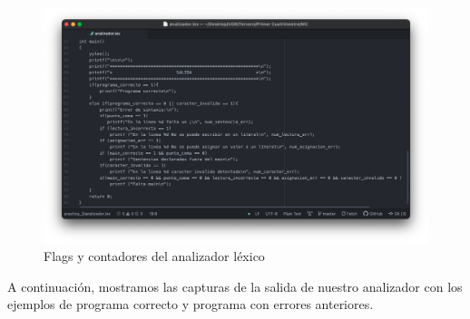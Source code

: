 \begin{figure}[H] 
	\centering
	\includegraphics[scale=0.39]{../practica_2/images/funciones_c.png} 
	\caption{Flags y contadores del analizador léxico} 
    \label{fig:funciones_c}
\end{figure}

A continuación, mostramos las capturas de la salida de nuestro analizador con los ejemplos de programa correcto y programa con errores anteriores.

